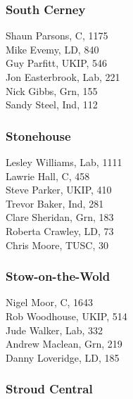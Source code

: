 \documentclass[a4paper,openany,10pt]{book}
\begin{document}
\subsubsection*{South Cerney}



Shaun Parsons, C, 1175\\
Mike Evemy, LD, 840\\
Guy Parfitt, UKIP, 546\\
Jon Easterbrook, Lab, 221\\
Nick Gibbs, Grn, 155\\
Sandy Steel, Ind, 112\\


\subsubsection*{Stonehouse}



Lesley Williams, Lab, 1111\\
Lawrie Hall, C, 458\\
Steve Parker, UKIP, 410\\
Trevor Baker, Ind, 281\\
Clare Sheridan, Grn, 183\\
Roberta Crawley, LD, 73\\
Chris Moore, TUSC, 30\\


\subsubsection*{Stow-on-the-Wold}



Nigel Moor, C, 1643\\
Rob Woodhouse, UKIP, 514\\
Jude Walker, Lab, 332\\
Andrew Maclean, Grn, 219\\
Danny Loveridge, LD, 185\\


\subsubsection*{Stroud Central}

\end{document}
